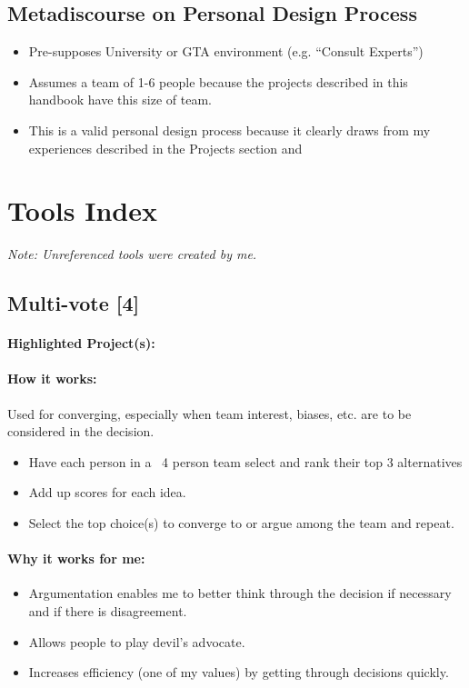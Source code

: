 \documentclass[a4paper,12pt]{article}
\begin{document}
\subsection{Metadiscourse on Personal Design Process}
\begin{itemize}
	\item Pre-supposes University or GTA environment (e.g. “Consult Experts”)
	\item Assumes a team of 1-6 people because the projects described in this handbook have this size of team.
	\item This is a valid personal design process because it clearly draws from my experiences described in the Projects section and 
\end{itemize}





\section{Tools Index}
\textit{Note: Unreferenced tools were created by me.}
\subsection{Multi-vote [4]}
\paragraph{Highlighted Project(s): }
\paragraph{How it works: } 
Used for converging, especially when team interest, biases, etc. are to be considered in the decision.
\begin{itemize}
	\item Have each person in a ~4 person team select and rank their top 3 alternatives
	\item Add up scores for each idea.
	\item Select the top choice(s) to converge to or argue among the team and repeat.
\end{itemize}

\paragraph{Why it works for me: }
\begin{itemize}
	\item Argumentation enables me to better think through the decision if necessary and if there is disagreement.
	\item Allows people to play devil’s advocate.
	\item Increases efficiency (one of my values) by getting through decisions quickly.
\end{itemize}
\end{document}
